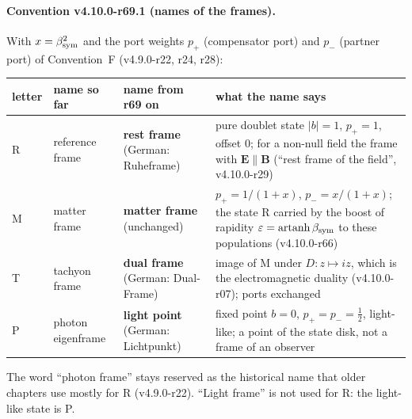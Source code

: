 \paragraph{Convention v4.10.0-r69.1 (names of the frames).}
With \(x=\beta_{\rm sym}^2\) and the port weights \(p_+\) (compensator port) and \(p_-\) (partner port) of Convention~F (v4.9.0-r22, r24, r28):
\begin{center}
\small
\begin{tabular}{@{}>{\raggedright\arraybackslash}p{}>{\raggedright\arraybackslash}p{}>{\raggedright\arraybackslash}p{}>{\raggedright\arraybackslash}p{}@{}}
\toprule
letter & name so far & name from r69 on & what the name says\\
\midrule
R & reference frame & \textbf{rest frame} (German: Ruheframe) & pure doublet state \(|b|=1\), \(p_+=1\), offset \(0\); for a non-null field the frame with \(\mathbf E\parallel\mathbf B\) (``rest frame of the field'', v4.10.0-r29)\\
M & matter frame & \textbf{matter frame} (unchanged) & \(p_+=1/(1+x)\), \(p_-=x/(1+x)\); the state R carried by the boost of rapidity \(\varepsilon=\operatorname{artanh}\beta_{\rm sym}\) to these populations (v4.10.0-r66)\\
T & tachyon frame & \textbf{dual frame} (German: Dual-Frame) & image of M under \(D\colon z\mapsto iz\), which is the electromagnetic duality (v4.10.0-r07); ports exchanged\\
P & photon eigenframe & \textbf{light point} (German: Lichtpunkt) & fixed point \(b=0\), \(p_+=p_-=\tfrac12\), light-like; a point of the state disk, not a frame of an observer\\
\bottomrule
\end{tabular}
\end{center}
The word ``photon frame'' stays reserved as the historical name that older chapters use mostly for R (v4.9.0-r22).  ``Light frame'' is not
used for R: the light-like state is P.

